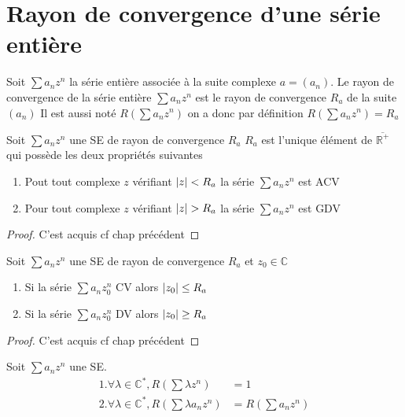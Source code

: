 \documentclass[11pt,hidelinks]{book}
\theoremstyle{mytheoremstyle}
\theoremstyle{mytheoremstyle}
\theoremstyle{mytheoremstyle}
\theoremstyle{mytheoremstyle}
\theoremstyle{mytheoremstyle}
\theoremstyle{mytheoremstyle}
\theoremstyle{mytheoremstyle}
\theoremstyle{mytheoremstyle}
\theoremstyle{myproblemstyle}
\def\mbb#1{\mathbb{#1}}
\def\bC{\mbb{C}}
\def\bR{\mbb{R}}
\def\se{\sum a_n z^n}
\def\seq#1{\sum a_n z_{#1}^n}
\newcommand{\parenth}[1]{\left(#1\right)}
\begin{document}
\section{Rayon de convergence d'une série entière}
\begin{definition}
    Soit $\sum a_n z^n$ la série entière associée à la suite complexe $a = (a_n)$. 
    Le rayon de convergence de la série entière $\sum a_n z^n$ est le rayon de convergence 
    $R_a$ de la suite $(a_n)$ Il est aussi noté $R\parenth{\sum a_n z^n}$ on a donc 
    par définition $R\parenth{\sum a_n z^n} = R_a$
\end{definition}
\begin{adjustwidth}{-2em}{-1em}
    \begin{theorem}
        Soit $\se$ une SE de rayon de convergence $R_a$ 
        $R_a$ est l'unique élément de $\overline{\bR^+}$ qui possède les deux propriétés suivantes 
        \begin{enumerate}
        \item Pout tout complexe $z$ vérifiant $\abs{z} < R_a$ la série $\se$ est ACV 
        \item Pour tout complexe $z$ vérifiant $\abs{z} > R_a$ la série $\se$ est GDV
        \end{enumerate}
        \begin{proof}
            C'est acquis cf chap précédent
        \end{proof}
    \end{theorem}
    \begin{prop}[Corollaire]
        Soit $\se$ une SE de rayon de convergence $R_a$ et $z_0 \in \bC$
        \begin{enumerate}
        \item Si la série $\seq{0}$ CV alors $\abs{z_0} \leq R_a$
        \item Si la série $\seq{0}$ DV alors $\abs{z_0} \geq R_a$
        \end{enumerate}
        \begin{proof}
            C'est acquis cf chap précédent
        \end{proof}
    \end{prop}
    \begin{prop}
        Soit $\se$ une SE. 
        \begin{align*}
            1.  \forall \lambda \in \bC^*,  R\parenth{\sum \lambda z^n } &= 1 \\ 
            2.  \forall \lambda \in \bC^*,  R\parenth{\sum \lambda a_n z^n} &= R\parenth{\se} \\ 

\end{align*}
\end{prop}
\end{adjustwidth}
\end{document}
